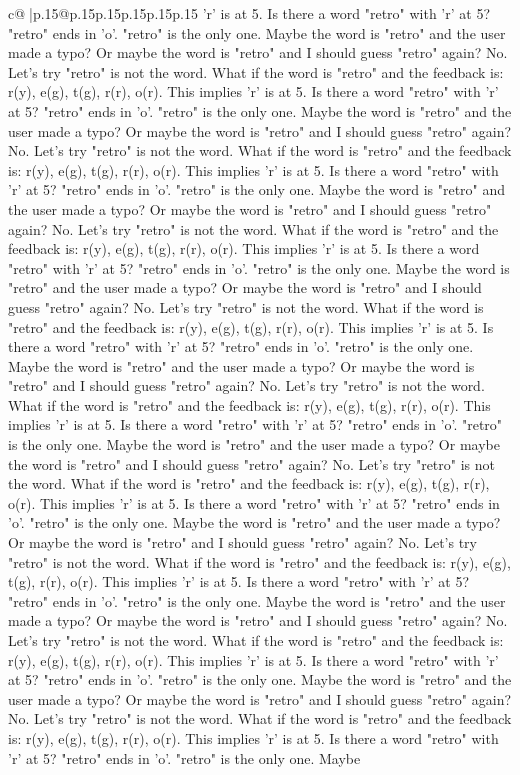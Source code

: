 \documentclass{article}
\begin{document}
{\begin{supertabular}{c@{$\;$}|p{.15\linewidth}@{}p{.15\linewidth}p{.15\linewidth}p{.15\linewidth}p{.15\linewidth}p{.15\linewidth}}
{{{'r' is at 5. Is there a word "retro" with 'r' at 5? "retro" ends in 'o'. "retro" is the only one. Maybe the word is "retro" and the user made a typo? Or maybe the word is "retro" and I should guess "retro" again? No. Let's try "retro" is not the word. What if the word is "retro" and the feedback is: r(y), e(g), t(g), r(r), o(r). This implies 'r' is at 5. Is there a word "retro" with 'r' at 5? "retro" ends in 'o'. "retro" is the only one. Maybe the word is "retro" and the user made a typo? Or maybe the word is "retro" and I should guess "retro" again? No. Let's try "retro" is not the word. What if the word is "retro" and the feedback is: r(y), e(g), t(g), r(r), o(r). This implies 'r' is at 5. Is there a word "retro" with 'r' at 5? "retro" ends in 'o'. "retro" is the only one. Maybe the word is "retro" and the user made a typo? Or maybe the word is "retro" and I should guess "retro" again? No. Let's try "retro" is not the word. What if the word is "retro" and the feedback is: r(y), e(g), t(g), r(r), o(r). This implies 'r' is at 5. Is there a word "retro" with 'r' at 5? "retro" ends in 'o'. "retro" is the only one. Maybe the word is "retro" and the user made a typo? Or maybe the word is "retro" and I should guess "retro" again? No. Let's try "retro" is not the word. What if the word is "retro" and the feedback is: r(y), e(g), t(g), r(r), o(r). This implies 'r' is at 5. Is there a word "retro" with 'r' at 5? "retro" ends in 'o'. "retro" is the only one. Maybe the word is "retro" and the user made a typo? Or maybe the word is "retro" and I should guess "retro" again? No. Let's try "retro" is not the word. What if the word is "retro" and the feedback is: r(y), e(g), t(g), r(r), o(r). This implies 'r' is at 5. Is there a word "retro" with 'r' at 5? "retro" ends in 'o'. "retro" is the only one. Maybe the word is "retro" and the user made a typo? Or maybe the word is "retro" and I should guess "retro" again? No. Let's try "retro" is not the word. What if the word is "retro" and the feedback is: r(y), e(g), t(g), r(r), o(r). This implies 'r' is at 5. Is there a word "retro" with 'r' at 5? "retro" ends in 'o'. "retro" is the only one. Maybe the word is "retro" and the user made a typo? Or maybe the word is "retro" and I should guess "retro" again? No. Let's try "retro" is not the word. What if the word is "retro" and the feedback is: r(y), e(g), t(g), r(r), o(r). This implies 'r' is at 5. Is there a word "retro" with 'r' at 5? "retro" ends in 'o'. "retro" is the only one. Maybe the word is "retro" and the user made a typo? Or maybe the word is "retro" and I should guess "retro" again? No. Let's try "retro" is not the word. What if the word is "retro" and the feedback is: r(y), e(g), t(g), r(r), o(r). This implies 'r' is at 5. Is there a word "retro" with 'r' at 5? "retro" ends in 'o'. "retro" is the only one. Maybe the word is "retro" and the user made a typo? Or maybe the word is "retro" and I should guess "retro" again? No. Let's try "retro" is not the word. What if the word is "retro" and the feedback is: r(y), e(g), t(g), r(r), o(r). This implies 'r' is at 5. Is there a word "retro" with 'r' at 5? "retro" ends in 'o'. "retro" is the only one. Maybe }}}
\end{supertabular}}
\end{document}
